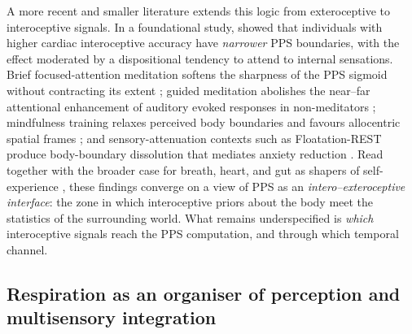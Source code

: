 A more recent and smaller literature extends this logic from exteroceptive to interoceptive signals. In a foundational study, \citet{Ardizzi2018} showed that individuals with higher cardiac interoceptive accuracy have \emph{narrower} PPS boundaries, with the effect moderated by a dispositional tendency to attend to internal sensations. Brief focused-attention meditation softens the sharpness of the PPS sigmoid without contracting its extent \citep{Chiarella2024}; guided meditation abolishes the near--far attentional enhancement of auditory evoked responses in non-meditators \citep{nguyen_2020}; mindfulness training relaxes perceived body boundaries and favours allocentric spatial frames \citep{hanley_2020}; and sensory-attenuation contexts such as Floatation-REST produce body-boundary dissolution that mediates anxiety reduction \citep{hruby_2024}. Read together with the broader case for breath, heart, and gut as shapers of self-experience \citep{seth2013interoceptive, barrett2016theory, Park2019, bogdanova_2021}, these findings converge on a view of PPS as an \emph{intero--exteroceptive interface}: the zone in which interoceptive priors about the body meet the statistics of the surrounding world. What remains underspecified is \emph{which} interoceptive signals reach the PPS computation, and through which temporal channel.

\subsection{Respiration as an organiser of perception and multisensory integration}



